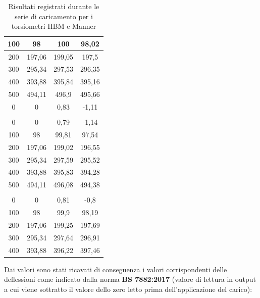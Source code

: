 \documentclass[a4paper, twoside]{article}
\begin{document}
\begin{table}[H]
{\begin{tabular}{|c|c|c|c|}
        100 & 98 & 100 & 98,02 \\
        \hline
        200 & 197,06 & 199,05 & 197,5 \\
        \hline
        300 & 295,34 & 297,53 & 296,35 \\
        \hline
        400 & 393,88 & 395,84 & 395,16 \\
        \hline
        500 & 494,11 & 496,9 & 495,66 \\
        \hline
        0 & 0 & 0,83 & -1,11 \\
        \hline
        \rowcolor{rowlight}
        \multicolumn{4}{|c|}{\textbf{Quarta serie}} \\
        \hline
        0 & 0 & 0,79 & -1,14 \\
        \hline
        100 & 98 & 99,81 & 97,54 \\
        \hline
        200 & 197,06 & 199,02 & 196,55 \\
        \hline
        300 & 295,34 & 297,59 & 295,52 \\
        \hline
        400 & 393,88 & 395,83 & 394,28 \\
        \hline
        500 & 494,11 & 496,08 & 494,38 \\
        \hline
        \rowcolor{rowlight}
        \multicolumn{4}{|c|}{\textbf{Quinta serie}} \\
        \hline
        0 & 0 & 0,81 & -0,8 \\
        \hline
        100 & 98 & 99,9 & 98,19 \\
        \hline
        200 & 197,06 & 199,25 & 197,69 \\
        \hline
        300 & 295,34 & 297,64 & 296,91 \\
        \hline
        400 & 393,88 & 396,22 & 397,46 \\
        \hline
    \end{tabular}%
    }
    \caption{Risultati registrati durante le serie di caricamento per i torsiometri HBM e Manner}
    \label{tab:risultati_taratura_renk}
\end{table}

\newpage
Dai valori sono stati ricavati di conseguenza i valori corrispondenti delle deflessioni come indicato dalla norma \textbf{BS 7882:2017} (valore di lettura in output a cui viene sottratto il valore dello zero letto prima dell'applicazione del carico):
\end{document}
